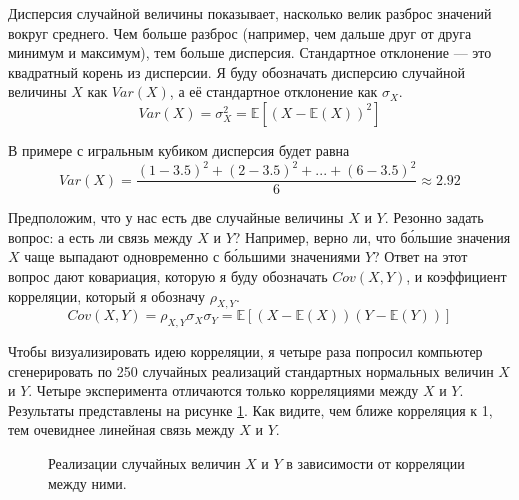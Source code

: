 Дисперсия случайной величины показывает, насколько велик разброс значений вокруг среднего. Чем больше разброс (например, чем дальше друг от друга минимум и максимум), тем больше дисперсия. Стандартное отклонение --- это квадратный корень из дисперсии. Я буду обозначать дисперсию случайной величины $X$ как  $Var(X)$, а её стандартное отклонение как $\sigma_X$.
\begin{equation*}
Var(X) = \sigma_X^2 = \mathbb{E}\left[(X - \mathbb{E}(X))^2 \right]
\end{equation*}

В примере с игральным кубиком дисперсия будет равна
\begin{equation*}
Var(X) = \dfrac{(1 - 3.5)^2 + (2 - 3.5)^2 + ... + (6 - 3.5)^2}{6} \approx 2.92
\end{equation*}

Предположим, что у нас есть две случайные величины $X$ и $Y$. Резонно задать вопрос: а есть ли связь между $X$ и $Y$? Например, верно ли, что б\'{о}льшие значения $X$ чаще выпадают одновременно с б\'{о}льшими значениями $Y$? Ответ на этот вопрос дают ковариация, которую я буду обозначать $Cov(X,Y)$, и коэффициент корреляции, который я обозначу $\rho_{X,Y}$.
\begin{equation*}
Cov(X,Y) = \rho_{X,Y}\sigma_X\sigma_Y = \mathbb{E}\left[(X - \mathbb{E}(X))(Y - \mathbb{E}(Y)) \right]
\end{equation*}

Чтобы визуализировать идею корреляции, я четыре раза попросил компьютер сгенерировать по 250 случайных реализаций стандартных нормальных величин $X$ и $Y$. Четыре эксперимента отличаются только корреляциями между $X$ и $Y$. Результаты представлены на рисунке \ref{covariance_example}. Как видите, чем ближе корреляция к 1, тем очевиднее линейная связь между $X$ и $Y$.

\begin{figure}[h!]
\centering
{}
\caption{Реализации случайных величин $X$ и $Y$ в зависимости от корреляции между ними.}
\label{covariance_example}
\end{figure}

